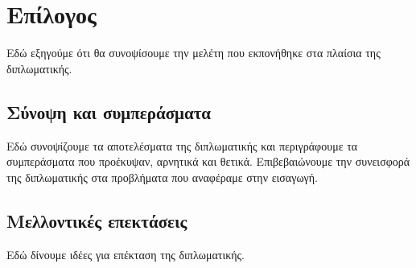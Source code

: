 \chapter{Επίλογος}
\label{chap8}

Εδώ εξηγούμε ότι θα συνοψίσουμε την μελέτη που εκπονήθηκε στα πλαίσια της διπλωματικής.

\section{Σύνοψη και συμπεράσματα}

Εδώ συνοψίζουμε τα αποτελέσματα της διπλωματικής και περιγράφουμε τα συμπεράσματα που προέκυψαν, αρνητικά και θετικά. Επιβεβαιώνουμε την συνεισφορά της διπλωματικής στα προβλήματα που αναφέραμε στην εισαγωγή.

\section{Μελλοντικές επεκτάσεις}

Εδώ δίνουμε ιδέες για επέκταση της διπλωματικής.
